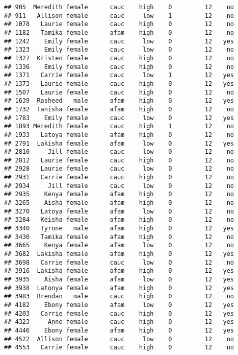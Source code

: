 \documentclass[
]{article}
\begin{document}
\begin{verbatim}
## 905  Meredith female      cauc    high    0         12    no
## 911   Allison female      cauc     low    1         12    no
## 1078   Laurie female      cauc    high    0         12    no
## 1182   Tamika female      afam    high    0         12    no
## 1242    Emily female      cauc     low    0         12   yes
## 1323    Emily female      cauc     low    0         12    no
## 1327  Kristen female      cauc    high    0         12    no
## 1336    Emily female      cauc    high    0         12    no
## 1371   Carrie female      cauc     low    1         12   yes
## 1373   Laurie female      cauc    high    0         12   yes
## 1507   Laurie female      cauc    high    0         12    no
## 1639  Rasheed   male      afam    high    0         12   yes
## 1732  Tanisha female      afam    high    0         12    no
## 1783    Emily female      cauc     low    0         12   yes
## 1893 Meredith female      cauc    high    1         12    no
## 1933   Latoya female      afam    high    0         12    no
## 2791  Lakisha female      afam     low    0         12   yes
## 2810     Jill female      cauc     low    0         12    no
## 2812   Laurie female      cauc    high    0         12    no
## 2928   Laurie female      cauc     low    0         12    no
## 2931   Carrie female      cauc    high    0         12    no
## 2934     Jill female      cauc     low    0         12    no
## 2935    Kenya female      afam    high    0         12    no
## 3265    Aisha female      afam    high    0         12    no
## 3270   Latoya female      afam     low    0         12    no
## 3284   Keisha female      afam    high    0         12    no
## 3340   Tyrone   male      afam    high    0         12   yes
## 3430   Tamika female      afam    high    0         12    no
## 3665    Kenya female      afam     low    0         12    no
## 3682  Lakisha female      afam    high    0         12   yes
## 3698   Carrie female      cauc     low    0         12    no
## 3916  Lakisha female      afam    high    0         12   yes
## 3935    Aisha female      afam     low    0         12   yes
## 3938  Latonya female      afam    high    0         12   yes
## 3983  Brendan   male      cauc    high    0         12    no
## 4182    Ebony female      afam     low    0         12   yes
## 4203   Carrie female      cauc    high    0         12   yes
## 4323     Anne female      cauc    high    0         12   yes
## 4446    Ebony female      afam    high    0         12   yes
## 4522  Allison female      cauc     low    0         12    no
## 4553   Carrie female      cauc    high    0         12    no

\end{verbatim}
\end{document}
